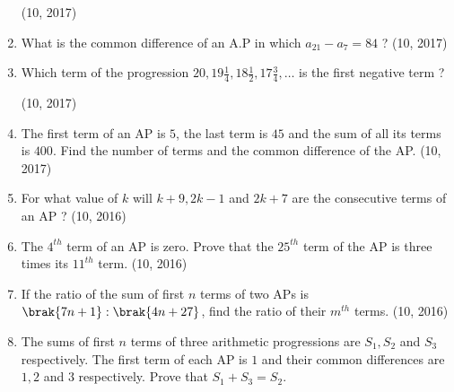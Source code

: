 \begin{enumerate}[label=\thesubsection.\arabic*,ref=\thesubsection.\theenumi,itemsep=1pt]
\hfill (10, 2017) \item What is the common difference of an A.P in which $a_{21} - a_7 = 84$ ?
\hfill (10, 2017) \item Which term of the progression $20,19\frac{1}{4},18\frac{1}{2},17\frac{3}{4},\dots$ is the first negative term ?

\hfill (10, 2017) \item The first term of an AP is $5$, the last term is $45$ and the sum of all its terms is $400$. Find the number of terms and the common difference of the AP.
\hfill (10, 2017)
 \item For what value of $k$ will $k+9, 2k-1$ and $2k+7$ are the consecutive terms of an AP ?
 \hfill (10, 2016) \item  The $4^{th}$ term of an AP is zero. Prove that the $25^{th}$ term of the AP is three times its $11^{th}$ term.
 \hfill (10, 2016) \item  If the ratio of the sum of first $n$ terms of two APs is $\brak{7n + 1} : \brak{4n + 27}$, find the ratio of their $m^{th}$ terms.
\hfill (10, 2016) \item The sums of first $n$ terms of three arithmetic progressions are $S_1, S_2$ and $S_3$ respectively. The first term of each AP is $1$ and their common differences are $1, 2$ and $3$ respectively. Prove that $S_1+S_3=S_2$.


\end{enumerate}
